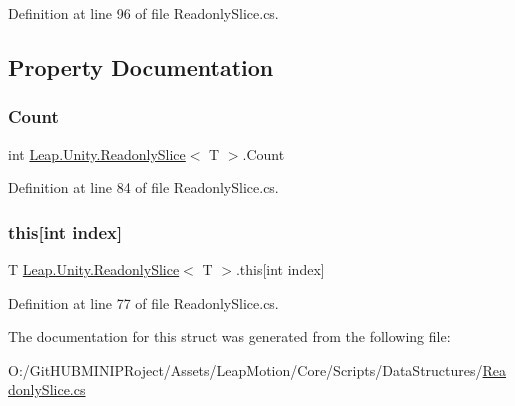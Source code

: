 Definition at line 96 of file Readonly\+Slice.\+cs.



\subsection{Property Documentation}
\mbox{\label{struct_leap_1_1_unity_1_1_readonly_slice_ade11ab84f8518b7dd6d27b2e4b69e6eb}} 
\subsubsection{\texorpdfstring{Count}{Count}}
{\footnotesize\ttfamily int \mbox{\hyperlink{struct_leap_1_1_unity_1_1_readonly_slice}{Leap.\+Unity.\+Readonly\+Slice}}$<$ T $>$.Count\hspace{0.3cm}{\ttfamily [get]}}



Definition at line 84 of file Readonly\+Slice.\+cs.

\mbox{\label{struct_leap_1_1_unity_1_1_readonly_slice_a9e8ee19db4c079a22b2e4f3640532280}} 
\subsubsection{\texorpdfstring{this[int index]}{this[int index]}}
{\footnotesize\ttfamily T \mbox{\hyperlink{struct_leap_1_1_unity_1_1_readonly_slice}{Leap.\+Unity.\+Readonly\+Slice}}$<$ T $>$.this\mbox{[}int index\mbox{]}\hspace{0.3cm}{\ttfamily [get]}}



Definition at line 77 of file Readonly\+Slice.\+cs.



The documentation for this struct was generated from the following file\+:\begin{DoxyCompactItemize}
\item 
O\+:/\+Git\+H\+U\+B\+M\+I\+N\+I\+P\+Roject/\+Assets/\+Leap\+Motion/\+Core/\+Scripts/\+Data\+Structures/\mbox{\hyperlink{_readonly_slice_8cs}{Readonly\+Slice.\+cs}}\end{DoxyCompactItemize}

